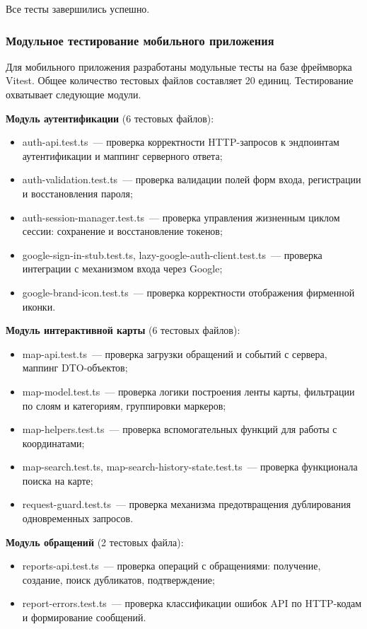 Все тесты завершились успешно.

\subsubsection{Модульное тестирование мобильного приложения}

Для мобильного приложения разработаны модульные тесты на базе фреймворка Vitest. Общее количество тестовых файлов составляет 20 единиц. Тестирование охватывает следующие модули.

\textbf{Модуль аутентификации} (6 тестовых файлов):
\begin{itemize}
    \item auth-api.test.ts~--- проверка корректности HTTP-запросов к эндпоинтам аутентификации и маппинг серверного ответа;
    \item auth-validation.test.ts~--- проверка валидации полей форм входа, регистрации и восстановления пароля;
    \item auth-session-manager.test.ts~--- проверка управления жизненным циклом сессии: сохранение и восстановление токенов;
    \item google-sign-in-stub.test.ts, lazy-google-auth-client.test.ts~--- проверка интеграции с механизмом входа через Google;
    \item google-brand-icon.test.ts~--- проверка корректности отображения фирменной иконки.
\end{itemize}

\textbf{Модуль интерактивной карты} (6 тестовых файлов):
\begin{itemize}
    \item map-api.test.ts~--- проверка загрузки обращений и событий с сервера, маппинг DTO-объектов;
    \item map-model.test.ts~--- проверка логики построения ленты карты, фильтрации по слоям и категориям, группировки маркеров;
    \item map-helpers.test.ts~--- проверка вспомогательных функций для работы с координатами;
    \item map-search.test.ts, map-search-history-state.test.ts~--- проверка функционала поиска на карте;
    \item request-guard.test.ts~--- проверка механизма предотвращения дублирования одновременных запросов.
\end{itemize}

\textbf{Модуль обращений} (2 тестовых файла):
\begin{itemize}
    \item reports-api.test.ts~--- проверка операций с обращениями: получение, создание, поиск дубликатов, подтверждение;
    \item report-errors.test.ts~--- проверка классификации ошибок API по HTTP-кодам и формирование сообщений.
\end{itemize}

